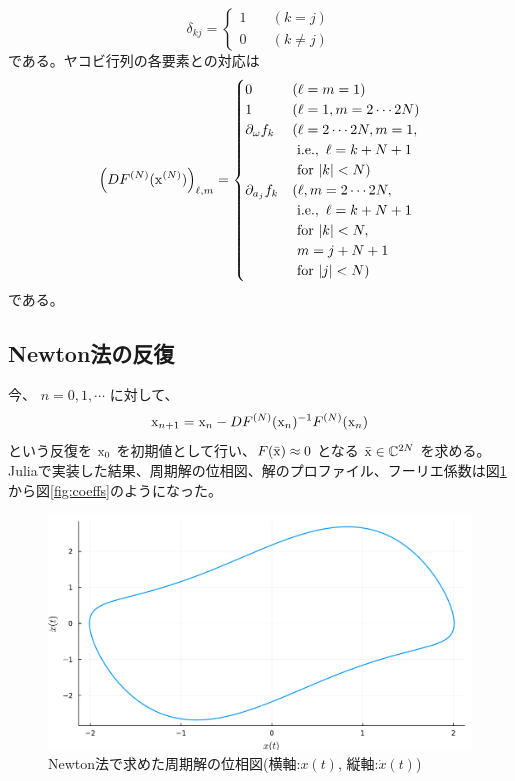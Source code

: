 \begin{equation*}
\delta_{kj} = 
\left\{ 
\begin{aligned}
1  \quad&(k=j)\\
0 \quad&(k\neq j) 
\end{aligned}
\right.
\end{equation*}
である。ヤコビ行列の各要素との対応は
$$
\left(DF^{(N)}(\mathrm x^{(N)})\right)_{\ell,m} = 
\begin{cases}
0 \ &(\ell=m=1) \\
1 \ &(\ell=1, m = 2 \cdots 2N) \\
\partial_\omega f_k &(\ell = 2 \cdots 2N, m = 1, \\
&~\mbox{i.e.},~\ell = k + N + 1~\\
&~\mbox{for}~|k|<N)\\
\partial_{a_j} f_k &(\ell,m = 2 \cdots 2N,\\
&~\mbox{i.e.},~\ell = k + N + 1~\\
&~\mbox{for}~|k|<N,\\
&~m = j + N + 1\\
&~\mbox{for}~|j|<N)
\end{cases}
$$
である。

\subsection{Newton法の反復}
今、 $n = 0,1,\cdots$ に対して、
$$
    \mathrm x_{n+1} = \mathrm x_n - DF^{(N)}(\mathrm x_n)^{-1} F^{(N)}(\mathrm x_n)
$$
という反復を $\mathrm x_0$ を初期値として行い、$F(\bar {\mathrm x})\approx 0$ となる $\bar {\mathrm x} \in \mathbb{C}^{2N}$ を求める。Juliaで実装した結果、周期解の位相図、解のプロファイル、フーリエ係数は図\ref{fig:Phase_plot}から図\ref{fig:coeffs}のようになった。

\begin{figure}[h]
	\begin{center}
	\includegraphics[keepaspectratio,scale = 0.35]{05_ODE/Phase_plot.pdf}
	\caption{Newton法で求めた周期解の位相図\newline \qquad (横軸:$x(t)$, 縦軸:$\dot{x}(t)$)}
	\label{fig:Phase_plot}
	\end{center}
\end{figure}

